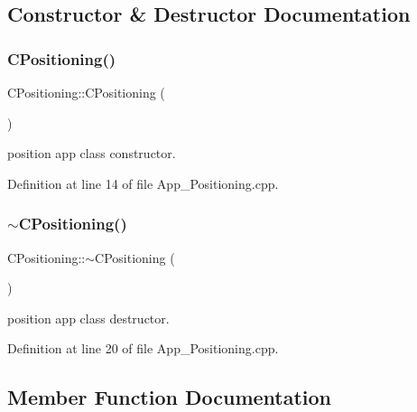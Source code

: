 \subsection{Constructor \& Destructor Documentation}
\mbox{\label{class_c_positioning_a2ef1dd3d4755b30ac7b800876de70869}} 
\subsubsection{\texorpdfstring{CPositioning()}{CPositioning()}}
{\footnotesize\ttfamily C\+Positioning\+::\+C\+Positioning (\begin{DoxyParamCaption}{ }\end{DoxyParamCaption})}



position app class constructor. 



Definition at line 14 of file App\+\_\+\+Positioning.\+cpp.

\mbox{\label{class_c_positioning_a2d1846176104d85f119010a471f6483d}} 
\subsubsection{\texorpdfstring{$\sim$CPositioning()}{~CPositioning()}}
{\footnotesize\ttfamily C\+Positioning\+::$\sim$\+C\+Positioning (\begin{DoxyParamCaption}{ }\end{DoxyParamCaption})}



position app class destructor. 



Definition at line 20 of file App\+\_\+\+Positioning.\+cpp.



\subsection{Member Function Documentation}
\mbox{\label{class_c_positioning_abdceba66e701554a178acf61c61b0df6}} 
